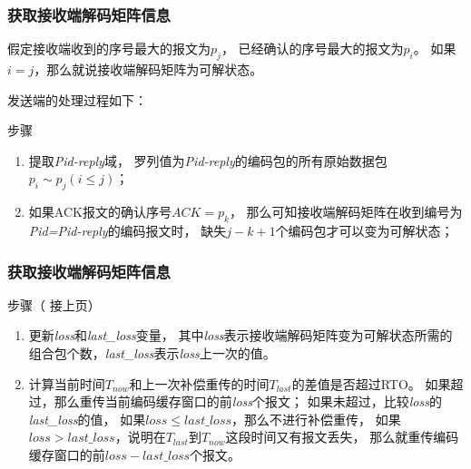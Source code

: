 \begin{frame}
	\frametitle{获取接收端解码矩阵信息}
	\begin{myDef}[矩阵可解状态]\label{def:kejie}
		假定接收端收到的序号最大的报文为$p_j$，
		已经确认的序号最大的报文为$p_i$。
		如果$i=j$，那么就说接收端解码矩阵为可解状态。
	\end{myDef}
发送端的处理过程如下：
	\begin{block}{步骤}
		\begin{enumerate}[<+-|alert@+>]
			\item 提取\emph{Pid-reply}域，
			罗列值为\emph{Pid-reply}的编码包的所有原始数据包$p_i \sim p_j(i \le j)$；
			\item 如果ACK报文的确认序号$ACK=p_k$，
			那么可知接收端解码矩阵在收到编号为\emph{Pid=Pid-reply}的编码报文时，
			缺失$j-k+1$个编码包才可以变为可解状态；

		\end{enumerate}
	\end{block}
\end{frame}


\begin{frame}
		\frametitle{获取接收端解码矩阵信息}
		\begin{block}{步骤（ 接上页）}
		\begin{enumerate}[<+-|alert@+>]
	\addtocounter{enumi}{2}
				\item 更新\emph{loss}和\emph{last\_loss}变量，
	其中\emph{loss}表示接收端解码矩阵变为可解状态所需的组合包个数，\emph{last\_loss}表示\emph{loss}上一次的值。
	\item  计算当前时间$T_{now}$和上一次补偿重传的时间$T_{last}$的差值是否超过RTO。
	如果超过，那么重传当前编码缓存窗口的前\emph{loss}个报文；
	如果未超过，比较\emph{loss}的\emph{last\_loss}的值，
	如果$loss \le last\_loss$，那么不进行补偿重传，
	如果$loss > last\_loss$，说明在$T_{last}$到$T_{now}$这段时间又有报文丢失，
	那么就重传编码缓存窗口的前$loss-last\_loss$个报文。
		\end{enumerate}
		\end{block}
\end{frame}

